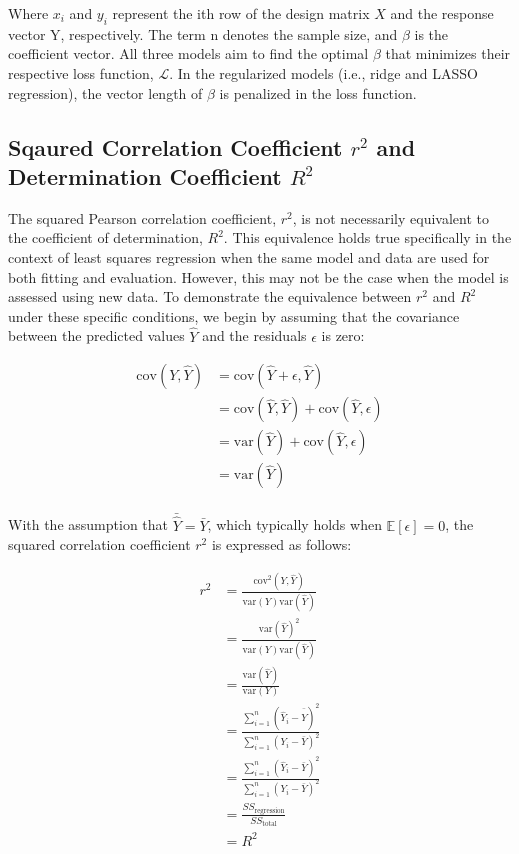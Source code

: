 Where $x_i$ and $y_i$ represent the ith row of the design matrix $X$ and the response vector Y, respectively. The term n denotes the sample size, and $\beta$ is the coefficient vector. All three models aim to find the optimal $\beta$ that minimizes their respective loss function, $\mathcal{L}$. In the regularized models (i.e., ridge and LASSO regression), the vector length of $\beta$ is penalized in the loss function.

\subsection*{Sqaured Correlation Coefficient $r^2$ and Determination Coefficient $R^2$}

The squared Pearson correlation coefficient, \( r^2 \), is not necessarily equivalent to the coefficient of determination, \( R^2 \). This equivalence holds true specifically in the context of least squares regression when the same model and data are used for both fitting and evaluation. However, this may not be the case when the model is assessed using new data. To demonstrate the equivalence between \( r^2 \) and \( R^2 \) under these specific conditions, we begin by assuming that the covariance between the predicted values \(\hat{Y}\) and the residuals \(\epsilon\) is zero:


\begin{equation} \label{eq_pf_cov}
    \begin{split}
        \text{cov}(Y, \hat{Y}) &= \text{cov}(\hat{Y} + \epsilon, \hat{Y}) \\
        &= \text{cov}(\hat{Y}, \hat{Y}) + \text{cov}(\hat{Y}, \epsilon) \\
        &= \text{var}(\hat{Y}) + \text{cov}(\hat{Y}, \epsilon) \\
        &= \text{var}(\hat{Y}) \\
    \end{split}
\end{equation}

With the assumption that \(\bar{\hat{Y}} = \bar{Y}\), which typically holds when \(\mathbb{E}[\epsilon] = 0\), the squared correlation coefficient \( r^2 \) is expressed as follows:

\begin{equation} \label{eq_pf_r2}
    \begin{split}
        r^2 &= \frac{\text{cov}^2(Y, \hat{Y})}{\text{var}(Y)\text{var}(\hat{Y})} \\
        &= \frac{\text{var}(\hat{Y})^2}{\text{var}(Y)\text{var}(\hat{Y})} \\
        &= \frac{\text{var}(\hat{Y})}{\text{var}(Y)} \\
        &= \frac{\sum\limits_{i=1}^{n}(\hat{Y}_i - \bar{\hat{Y}})^2}{\sum\limits_{i=1}^{n}(Y_i - \bar{Y})^2} \\
        &= \frac{\sum\limits_{i=1}^{n}(\hat{Y}_i - \bar{Y})^2}{\sum\limits_{i=1}^{n}(Y_i - \bar{Y})^2} \\
        &= \frac{SS_{\text{regression}}}{SS_{\text{total}}} \\
        &= R^2
    \end{split}
\end{equation}

